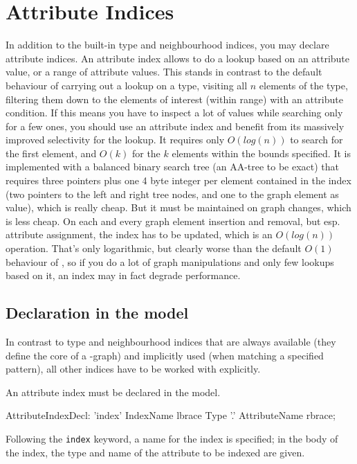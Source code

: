 \section{Attribute Indices}\label{sec:attributeindices}
In addition to the built-in type and neighbourhood indices, you may declare attribute indices.
An attribute index allows to do a lookup based on an attribute value, or a range of attribute values.
This stands in contrast to the default behaviour of carrying out a lookup on a type, visiting all $n$ elements of the type, filtering them down to the elements of interest (within range) with an attribute condition.
If this means you have to inspect a lot of values while searching only for a few ones, you should use an attribute index and benefit from its massively improved selectivity for the lookup.
It requires only $O(log(n))$ to search for the first element, and $O(k)$ for the $k$ elements within the bounds specified.
It is implemented with a balanced binary search tree (an AA-tree\cite{Andersson93balancedsearch} to be exact) that requires three pointers plus one 4 byte integer per element contained in the index (two pointers to the left and right tree nodes, and one to the graph element as value), which is really cheap.
But it must be maintained on graph changes, which is less cheap.
On each and every graph element insertion and removal, but esp. attribute assignment, the index has to be updated, which is an $O(log(n))$ operation.
That's only logarithmic, but clearly worse than the default $O(1)$ behaviour of \GrG{}, so if you do a lot of graph manipulations and only few lookups based on it, an index may in fact degrade performance.

\subsection*{Declaration in the model}
In contrast to type and neighbourhood indices that are always available (they define the core of a \GrG{}-graph) and implicitly used (when matching a specified pattern), all other indices have to be worked with explicitly.

An attribute index must be declared in the model.

\begin{rail}
  AttributeIndexDecl: 'index' IndexName lbrace Type '.' AttributeName rbrace;
\end{rail}

Following the \texttt{index} keyword, a name for the index is specified; in the body of the index, the type and name of the attribute to be indexed are given.

